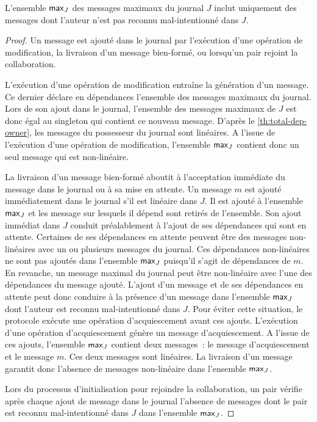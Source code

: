 \begin{lemma}\label{th:max-without-known-malicious}
L'ensemble $\operatorname{\mathsf{max}}_J$ des messages maximaux du journal $J$ inclut uniquement des messages dont l'auteur n'est pas reconnu mal-intentionné dans $J$.
\end{lemma}
\begin{proof}
Un message est ajouté dans le journal par l'exécution d'une opération de modification, la livraison d'un message bien-formé, ou lorsqu'un pair rejoint la collaboration.

L'exécution d'une opération de modification entraîne la génération d'un message.
Ce dernier déclare en dépendances l'ensemble des messages maximaux du journal.
Lors de son ajout dans le journal, l'ensemble des messages maximaux de $J$ est donc égal au singleton qui contient ce nouveau message.
D'après le \autoref{th:total-dep-owner}, les messages du possesseur du journal sont linéaires.
A l'issue de l'exécution d'une opération de modification, l'ensemble $\operatorname{\mathsf{max}}_J$ contient donc un seul message qui est non-linéaire.

La livraison d'un message bien-formé aboutit à l'acceptation immédiate du message dans le journal ou à sa mise en attente.
Un message $m$ est ajouté immédiatement dans le journal s'il est linéaire dans $J$.
Il est ajouté à l'ensemble $\operatorname{\mathsf{max}}_J$ et les message sur lesquels il dépend sont retirés de l'ensemble.
Son ajout immédiat dans $J$ conduit préalablement à l'ajout de ses dépendances qui sont en attente.
Certaines de ses dépendances en attente peuvent être des messages non-linéaires avec un ou plusieurs messages du journal.
Ces dépendances non-linéaires ne sont pas ajoutés dans l'ensemble $\operatorname{\mathsf{max}}_J$ puisqu'il s'agit de dépendances de $m$.
En revanche, un message maximal du journal peut être non-linéaire avec l'une des dépendances du message ajouté.
L'ajout d'un message et de ses dépendances en attente peut donc conduire à la présence d'un message dans l'ensemble $\operatorname{\mathsf{max}}_J$ dont l'auteur est reconnu mal-intentionné dans $J$.
Pour éviter cette situation, le protocole exécute une opération d'acquiescement avant ces ajouts.
L'exécution d'une opération d'acquiescement génère un message d'acquiescement.
A l'issue de ces ajouts, l'ensemble $\operatorname{\mathsf{max}}_J$ contient deux messages~: le message d'acquiescement et le message $m$.
Ces deux messages sont linéaires.
La livraison d'un message garantit donc l'absence de messages non-linéaire dans l'ensemble $\operatorname{\mathsf{max}}_J$.

Lors du processus d'initialisation pour rejoindre la collaboration, un pair vérifie après chaque ajout de message dans le journal l'absence de messages dont le pair est reconnu mal-intentionné dans $J$ dans l'ensemble $\operatorname{\mathsf{max}}_J$.
\end{proof}

